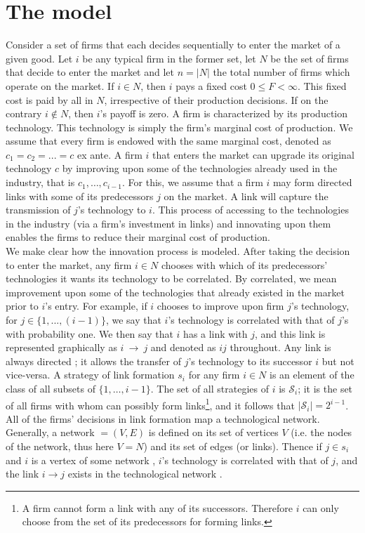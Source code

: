 \documentclass{article}
\begin{document}
\section{The model}

\indent Consider a set of firms that each decides sequentially to enter the market of a given good. Let $i$ be any typical firm in the former set, let $N$ be the set of firms that decide to enter the market and let $n=|N|$ the total number of firms which operate on the market. If $i\in N$, then $i$ pays a fixed cost $0\leq F< \infty$. This fixed cost is paid by all in $N$, irrespective of their production decisions. If on the contrary $i\notin N$, then $i$'s payoff is zero. A firm is characterized by its production technology. This technology is simply the firm's marginal cost of production. We assume that every firm is endowed with the same marginal cost, denoted as $c_1=c_2=...=c$ ex ante. A firm $i$ that enters the market can upgrade its original technology $c$ by improving upon some of the technologies already used in the industry, that is $c_1,\ldots, c_{i-1}$. For this, we assume that a firm $i$ may form directed links with some of its predecessors $j$ on the market. A link will capture the transmission of $j$'s technology to $i$. This process of accessing to the technologies in the industry (via a firm's investment in links) and innovating upon them enables the firms to reduce their marginal cost of production. \\
\indent We make clear how the innovation process is modeled. After taking the decision to enter the market, any firm $i\in N$ chooses with which of its predecessors' technologies it wants its technology to be correlated. By correlated, we mean improvement upon some of the technologies that already existed in the market prior to $i$'s entry. For example, if $i$ chooses to improve upon firm $j$'s technology, for $j\in \{1,...,(i-1)\}$, we say that $i$'s technology is correlated with that of $j$'s with probability one. We then say that $i$ has a link with $j$, and this link is represented graphically as $i~\rightarrow ~j$ and denoted as $ij$ throughout. Any link is always directed ; it allows the transfer of $j$'s technology to its successor $i$ but not vice-versa. A strategy of link formation $s_i$ for any firm $i\in N$ is an element of the class of all subsets of $\{1,\ldots , i-1\}$.  The set of all strategies of $i$ is $\mathcal{S}_i$; it is the set of all firms with whom can possibly form links\footnote{A firm cannot form a link with any of its successors. Therefore $i$ can only choose from the set of its predecessors for forming links.}, and it follows that $|\mathcal{S}_i|=2^{i-1}$. All of the firms' decisions in link formation map a technological network. Generally, a network $=(V,E)$ is defined on its set of vertices $V$ (i.e. the nodes of the network, thus here $V=N$) and its set of edges (or links). Thence if $j\in s_i$ and $i$ is a vertex of some network , $i$'s technology is correlated with that of $j$, and the link $i\rightarrow j$ exists in the technological network . \\
\end{document}
